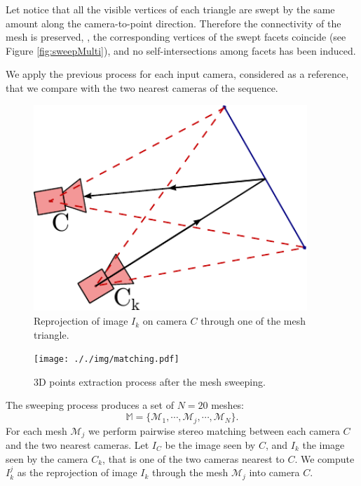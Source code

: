 Let notice that all the visible vertices of each triangle are swept by the same amount along the camera-to-point direction. 
Therefore the connectivity of the mesh is preserved, \ie, the corresponding vertices of the swept facets coincide (see Figure \ref{fig:sweepMulti}),  and no self-intersections among facets has been induced. 

We apply the previous process for each input camera, considered as a reference, that we compare with the two nearest cameras of the sequence.



\begin{figure}[t]
\centering
\includegraphics[width=0.92\textwidth]{./img/ch-sweep/sweepingBase}
\caption{Reprojection of image $I_k$ on camera $C$ through one of the mesh triangle.}
\label{fig:stereo}
\end{figure}

\begin{figure}[t]
  \centering
  \texttt{[image: ././img/matching.pdf]}
\caption{3D points extraction process after the mesh sweeping.}
  \label{fig:matching}
\end{figure}


The sweeping process produces a set of $N = 20$ meshes:
\[
    \mathbb{M} = \{\mathcal{M}_1, \cdots, \mathcal{M}_j ,\cdots, \mathcal{M}_N\}.
\]
For each mesh $\mathcal{M}_j$ we perform pairwise stereo matching between each camera $C$ and the two nearest cameras.
Let $I_C$ be the image seen by $C$, and $I_k$ the image seen by the camera $C_k$, that is one of the two cameras nearest to $C$. 
We compute $I_k^j$ as the reprojection of image $I_k$ through the mesh $\mathcal{M}_j$ into camera $C$.

